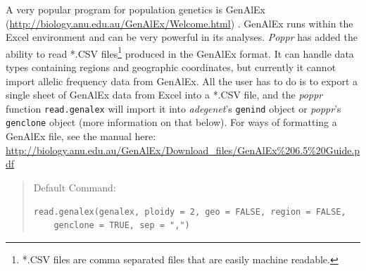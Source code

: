 \documentclass[letterpaper]{article}\usepackage[]{graphicx}\usepackage[]{color}
\makeatletter
\newenvironment{kframe}{%
 \def\at@end@of@kframe{}%
 \ifinner\ifhmode%
  \def\at@end@of@kframe{\end{minipage}}%
  \begin{minipage}{\columnwidth}%
 \fi\fi%
 \def\FrameCommand##1{\hskip\@totalleftmargin \hskip-\fboxsep
 \colorbox{shadecolor}{##1}\hskip-\fboxsep
     \hskip-\linewidth \hskip-\@totalleftmargin \hskip\columnwidth}%
 \MakeFramed {\advance\hsize-\width
   \@totalleftmargin\z@ \linewidth\hsize
   \@setminipage}}%
 {\par\unskip\endMakeFramed%
 \at@end@of@kframe}
\newenvironment{knitrout}{}{} %
\newcommand{\tab}{\hspace*{1em}}
\newcommand{\poppr}{\textit{poppr}}
\newcommand{\Poppr}{\textit{Poppr}}
\newcommand{\adegenet}{\textit{adegenet}}
\makeatother
\begin{document}
\tab\tab A very popular program for population genetics is GenAlEx (\url{http://biology.anu.edu.au/GenAlEx/Welcome.html}) \cite{Peakall:2012, Peakall:2006}. GenAlEx runs within the Excel environment and can be very powerful in its analyses. \Poppr{} has added the ability to read *.CSV files\footnote{*.CSV files are comma separated files that are easily machine readable.} produced in the GenAlEx format. It can handle data types containing regions and geographic coordinates, but currently it cannot import allelic frequency data from GenAlEx. All the user has to do is to export a single sheet of GenAlEx data from Excel into a *.CSV file, and the \poppr{} function \texttt{read.genalex} will import it into \adegenet{}'s \texttt{genind} object or \poppr{}'s \texttt{genclone} object (more information on that below). For ways of formatting a GenAlEx file, see the manual here: \url{http://biology.anu.edu.au/GenAlEx/Download_files/GenAlEx\%206.5\%20Guide.pdf}
\begin{quote}
Default Command:
\begin{knitrout}
\color{fgcolor}\begin{kframe}
\begin{verbatim}
read.genalex(genalex, ploidy = 2, geo = FALSE, region = FALSE, 
    genclone = TRUE, sep = ",")
\end{verbatim}
\end{kframe}
\end{knitrout}

\end{quote}
\end{document}
